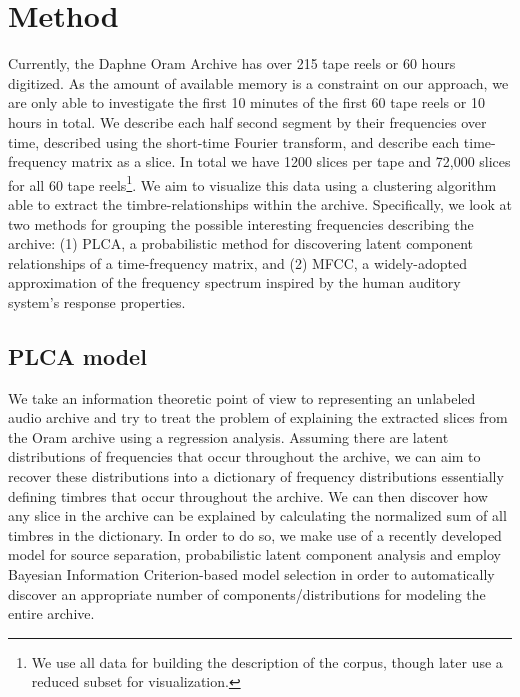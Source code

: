 





\section{Method}\label{method}

Currently, the Daphne Oram Archive has over 215 tape reels or 60 hours digitized.  As the amount of available memory is a constraint on our approach, we are only able to investigate the first 10 minutes of the first 60 tape reels or 10 hours in total.  We describe each half second segment by their frequencies over time, described using the short-time Fourier transform, and describe each time-frequency matrix as a slice.  In total we have 1200 slices per tape and 72,000 slices for all 60 tape reels\footnote{We use all data for building the description of the corpus, though later use a reduced subset for visualization.}.  We aim to visualize this data using a clustering algorithm able to extract the timbre-relationships within the archive.  Specifically, we look at two methods for grouping the possible interesting frequencies describing the archive: (1) PLCA, a probabilistic method for discovering latent component relationships of a time-frequency matrix, and (2) MFCC, a widely-adopted approximation of the frequency spectrum inspired by the human auditory system's response properties.

\subsection{PLCA model}
We take an information theoretic point of view to representing an unlabeled audio archive and try to treat the problem of explaining the extracted slices from the Oram archive using a regression analysis.  Assuming there are latent distributions of frequencies that occur throughout the archive, we can aim to recover these distributions into a dictionary of frequency distributions essentially defining timbres that occur throughout the archive.  We can then discover how any slice in the archive can be explained by calculating the normalized sum of all timbres in the dictionary.  In order to do so, we make use of a recently developed model for source separation, probabilistic latent component analysis \cite{SmaragdisRajShashanka} and employ Bayesian Information Criterion-based model selection in order to automatically discover an appropriate number of components/distributions for modeling the entire archive.  

